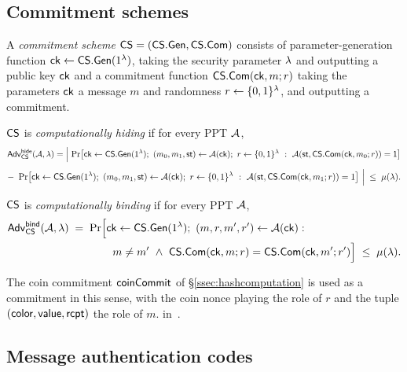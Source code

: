 \subsection{Commitment schemes}
\label{ssec:comdef}

\begin{definition}
\label{def:commit}
A \emph{commitment scheme} $\mathsf{CS} = (\mathsf{CS.Gen}, \mathsf{CS.Com})$ consists of  parameter-generation function $\mathsf{ck} \gets \mathsf{CS.Gen}(1^{\lambda})$, taking the security parameter $\lambda$ and outputting a public key $\mathsf{ck}$ and
a commitment function $\mathsf{CS.Com}(\mathsf{ck}, m; r)$ taking the parameters $\mathsf{ck}$ a message $m$ and randomness $r \gets \{0,1\}^{\lambda}$, and outputting a commitment.
\end{definition}

\begin{definition}
\label{def:hiding}
$\mathsf{CS}$ is \emph{computationally hiding} if for every PPT $\mathcal{A}$,
\[
\mathsf{Adv}^{\mathsf{hide}}_{\mathsf{CS}}(\mathcal{A},\lambda) =
\Bigl|\ \Pr\bigl[\mathsf{ck} \gets \mathsf{CS.Gen}(1^{\lambda});\ (m_0,m_1,\mathsf{st}) \gets \mathcal{A}(\mathsf{ck});\
r \gets \{0,1\}^{\lambda}\ :\ \mathcal{A}(\mathsf{st}, \mathsf{CS.Com}(\mathsf{ck},m_0;r)) = 1\bigr]
\]
\[
-\ \Pr\bigl[\mathsf{ck} \gets \mathsf{CS.Gen}(1^{\lambda});\ (m_0,m_1,\mathsf{st}) \gets \mathcal{A}(\mathsf{ck});\
r \gets \{0,1\}^{\lambda}\ :\ \mathcal{A}(\mathsf{st}, \mathsf{CS.Com}(\mathsf{ck},m_1;r)) = 1\bigr]\ \Bigr|
\;\le\; \mu(\lambda).
\]
\end{definition}

\begin{definition}
\label{def:binding}
$\mathsf{CS}$ is \emph{computationally binding} if for every PPT $\mathcal{A}$,
\begin{align*}
  \mathsf{Adv}^{\mathsf{bind}}_{\mathsf{CS}}(\mathcal{A},\lambda) &\;=\; \Pr\Bigl[\mathsf{ck} \gets \mathsf{CS.Gen}(1^{\lambda});\ (m,r,m',r') \gets \mathcal{A}(\mathsf{ck}) : \\
  &\qquad\qquad m \neq m' \ \wedge\ \mathsf{CS.Com}(\mathsf{ck},m;r) = \mathsf{CS.Com}(\mathsf{ck},m';r')\Bigr] \;\le\; \mu(\lambda).
\end{align*}
\end{definition}

\noindent The coin commitment $\mathsf{coinCommit}$ of \S\ref{ssec:hashcomputation} is used as a commitment
in this sense, with the coin nonce playing the role of $r$ and the tuple $(\mathsf{color}, \mathsf{value}, \mathsf{rcpt})$ the role of $m$.
in~\cite{KatzLindell}.

\subsection{Message authentication codes}
\label{ssec:macdef}

